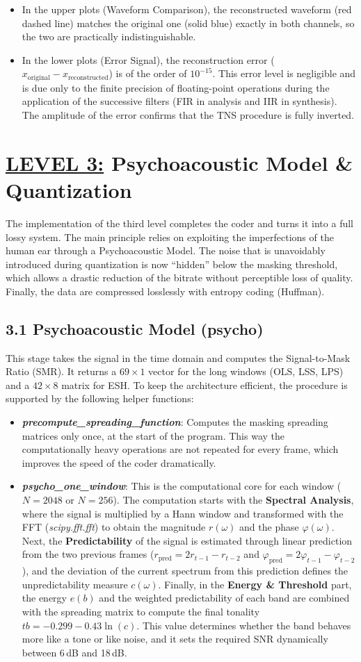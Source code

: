 \documentclass[11pt,twocolumn]{article}
\newcommand{\fn}[1]{\textit{#1}}
\newcommand{\level}[2]{\section*{\underline{LEVEL #1:} #2}}
\newcommand{\sub}[1]{\subsection*{#1}}
\begin{document}
\begin{itemize}[label=$\blacktriangleright$]
  \item In the upper plots (Waveform Comparison), the reconstructed waveform (red dashed line) matches the original one (solid blue) exactly in both channels, so the two are practically indistinguishable.
  \item In the lower plots (Error Signal), the reconstruction error ($x_{\text{original}} - x_{\text{reconstructed}}$) is of the order of $10^{-15}$. This error level is negligible and is due only to the finite precision of floating-point operations during the application of the successive filters (FIR in analysis and IIR in synthesis). The amplitude of the error confirms that the TNS procedure is fully inverted.
\end{itemize}

\level{3}{Psychoacoustic Model \& Quantization}

The implementation of the third level completes the coder and turns it into a full lossy system. The main principle relies on exploiting the imperfections of the human ear through a Psychoacoustic Model. The noise that is unavoidably introduced during quantization is now ``hidden'' below the masking threshold, which allows a drastic reduction of the bitrate without perceptible loss of quality. Finally, the data are compressed losslessly with entropy coding (Huffman).

\sub{3.1 Psychoacoustic Model (psycho)}
This stage takes the signal in the time domain and computes the Signal-to-Mask Ratio (SMR). It returns a $69\times1$ vector for the long windows (OLS, LSS, LPS) and a $42\times8$ matrix for ESH. To keep the architecture efficient, the procedure is supported by the following helper functions:
\begin{itemize}
  \item \textbf{\fn{precompute\_spreading\_function}}: Computes the masking spreading matrices only once, at the start of the program. This way the computationally heavy operations are not repeated for every frame, which improves the speed of the coder dramatically.
  \item \textbf{\fn{psycho\_one\_window}}: This is the computational core for each window ($N=2048$ or $N=256$). The computation starts with the \textbf{Spectral Analysis}, where the signal is multiplied by a Hann window and transformed with the FFT (\fn{scipy.fft.fft}) to obtain the magnitude $r(\omega)$ and the phase $\varphi(\omega)$. Next, the \textbf{Predictability} of the signal is estimated through linear prediction from the two previous frames ($r_{\text{pred}} = 2r_{t-1} - r_{t-2}$ and $\varphi_{\text{pred}} = 2\varphi_{t-1} - \varphi_{t-2}$), and the deviation of the current spectrum from this prediction defines the unpredictability measure $c(\omega)$. Finally, in the \textbf{Energy \& Threshold} part, the energy $e(b)$ and the weighted predictability of each band are combined with the spreading matrix to compute the final tonality $tb = -0.299 - 0.43\ln(c)$. This value determines whether the band behaves more like a tone or like noise, and it sets the required SNR dynamically between 6\,dB and 18\,dB.
\end{itemize}
\end{document}
